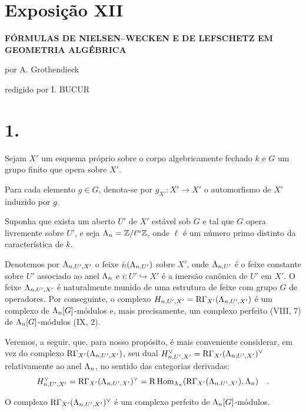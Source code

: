 \section*{Exposição XII}

\begin{center}
\Large\bf FÓRMULAS DE NIELSEN--WECKEN E DE LEFSCHETZ EM GEOMETRIA ALGÉBRICA
\end{center}

\begin{center}
por A. Grothendieck

redigido por I. BUCUR
\end{center}

\bigskip

\section*{1.}
Sejam $X'$ um esquema próprio sobre o corpo algebricamente fechado $k$ e $G$ um grupo finito que opera sobre $X'$.

Para cada elemento $g \in G$, denota-se por $g_{X'} : X' \to X'$ o automorfismo de $X'$ induzido por $g$.

Suponha que exista um aberto $U'$ de $X'$ estável sob $G$ e tal que $G$ opera livremente sobre $U'$, e seja $\Lambda_n = \mathbb Z/\ell^n\mathbb Z$, onde $\ell$ é um número primo distinto da característica de $k$.

Denotemos por $\Lambda_{n,U',X'}$ o feixe $i_!(\Lambda_{n,U'})$ sobre $X'$, onde $\Lambda_{n,U'}$ é o feixe constante sobre $U'$ associado ao anel $\Lambda_n$ e $i : U' \hookrightarrow X'$ é a imersão canônica de $U'$ em $X'$. O feixe $\Lambda_{n,U',X'}$ é naturalmente munido de uma estrutura de feixe com grupo $G$ de operadores. Por conseguinte, o complexo $H_{n,U',X'} = \mathrm{R}\Gamma_{X'}(\Lambda_{n,U',X'})$ é um complexo de $\Lambda_n[G]$-módulos e, mais precisamente, um complexo perfeito (VIII, 7) de $\Lambda_n[G]$-módulos (IX, 2).

Veremos, a seguir, que, para nosso propósito, é mais conveniente considerar, em vez do complexo $\mathrm{R}\Gamma_{X'}(\Lambda_{n,U',X'})$, seu dual $H_{n,U',X'}^\vee = \mathrm{R}\Gamma_{X'}(\Lambda_{n,U',X'})^\vee$ relativamente ao anel $\Lambda_n$, no sentido das categorias derivadas:
\[
H_{n,U',X'}^\vee = \mathrm{R}\Gamma_{X'}(\Lambda_{n,U',X'})^\vee = \mathrm{R}\operatorname{Hom}_{\Lambda_n}(\mathrm{R}\Gamma_{X'}(\Lambda_{n,U',X'}), \Lambda_n) \quad .
\]

O complexo $\mathrm{R}\Gamma_{X'}(\Lambda_{n,U',X'})^\vee$ é um complexo perfeito de $\Lambda_n[G]$-módulos.
